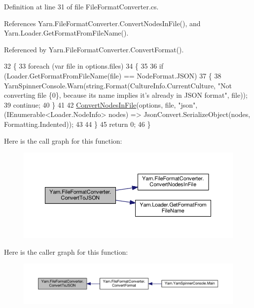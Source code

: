 Definition at line 31 of file File\-Format\-Converter.\-cs.



References Yarn.\-File\-Format\-Converter.\-Convert\-Nodes\-In\-File(), and Yarn.\-Loader.\-Get\-Format\-From\-File\-Name().



Referenced by Yarn.\-File\-Format\-Converter.\-Convert\-Format().


\begin{DoxyCode}
32         \{
33             \textcolor{keywordflow}{foreach} (var file \textcolor{keywordflow}{in} options.files)
34             \{
35 
36                 \textcolor{keywordflow}{if} (Loader.GetFormatFromFileName(file) == NodeFormat.JSON)
37                 \{
38                     YarnSpinnerConsole.Warn(string.Format(CultureInfo.CurrentCulture, \textcolor{stringliteral}{"Not converting file
       \{0\}, because its name implies it's already in JSON format"}, file));
39                     \textcolor{keywordflow}{continue};
40                 \}
41 
42                 \hyperlink{a00107_aa72838be584177b5592c31d73c0febdb}{ConvertNodesInFile}(options, file, \textcolor{stringliteral}{"json"}, (IEnumerable<Loader.NodeInfo> 
      nodes) => JsonConvert.SerializeObject(nodes, Formatting.Indented));
43 
44             \}
45             \textcolor{keywordflow}{return} 0;
46         \}
\end{DoxyCode}


Here is the call graph for this function\-:
\nopagebreak
\begin{figure}[H]
\begin{center}
\leavevmode
\includegraphics[width=350pt]{a00107_a28a086a7b44ecea7430af40436f38df6_cgraph}
\end{center}
\end{figure}




Here is the caller graph for this function\-:
\nopagebreak
\begin{figure}[H]
\begin{center}
\leavevmode
\includegraphics[width=350pt]{a00107_a28a086a7b44ecea7430af40436f38df6_icgraph}
\end{center}
\end{figure}


